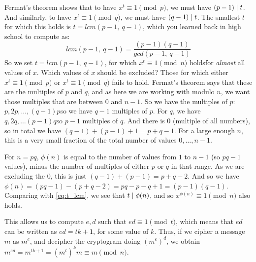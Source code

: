   Fermat's theorem shows that to have $x^t \equiv 1 \pmod{p}$, we must have $(p-1)\mathrel{|} t$. And similarly, to have $x^t \equiv 1 \pmod{q}$, we must have $(q-1)\mathrel{|} t$. The smallest $t$ for which this holds is $t = lcm(p-1,\ q-1)$, which you learned back in high school to compute as:
  \begin{equation}
    \label{eq:t_lcm}
    lcm(p-1,\ q-1) = \frac{(p-1)(q-1)}{gcd(p-1,\ q-1)}
  \end{equation}
  So we set $t = lcm(p-1,\ q-1)$, for which $x^t\equiv 1 \pmod{n}$ holds\emd for \emph{almost} all values of $x$. Which values of $x$ should be excluded? Those for which either $x^t \equiv 1 \pmod{p}$ or $x^t \equiv 1 \pmod{q}$ fails to hold. Fermat's theorem says that these are the multiples of $p$ and $q$, and as here we are working with modulo $n$, we want those multiples that are between $0$ and $n-1$. So we have the multiples of $p$: $p, 2p, \dots, (q-1)p$\emd so we have $q-1$ multiples of $p$. For $q$, we have $q, 2q, \dots (p-1)q$\emd so $p-1$ multiples of $q$. And there is $0$ (multiple of all numbers), so in total we have $(q-1) + (p-1) + 1 = p+q-1$. For a large enough $n$, this is a very small fraction of the total number of values $0, \dots, n-1$.
  \begin{remark}
    \label{rem:n_pq_totient}
    For $n=pq$, $\phi(n)$ is equal to the number of values from $1$ to $n-1$ (so $pq-1$ values), minus the number of multiples of either $p$ or $q$ in that range. As we are excluding the $0$, this is just $(q-1) + (p-1) = p +q - 2$. And so we have $\phi(n) = (pq - 1) - (p + q -2) = pq - p - q + 1 = (p-1)(q - 1)$. Comparing with \eqref{eq:t_lcm}, we see that $t\mathrel{|} \phi(n)$, and so $x^{\phi(n)} \equiv 1\pmod{n}$ also holds.
  \end{remark}

  \medskip

   This allows us to compute $e, d$ such that $ed \equiv 1 \pmod{t}$, which means that $ed$ can be written as $ed = tk + 1$, for some value of $k$. Thus, if we cipher a message $m$ as $m^e$, and decipher the cryptogram doing $(m^{e})^d$, we obtain $m^{ed} = m^{tk +1} = (m^t)^k m \equiv m\pmod{n}$.

